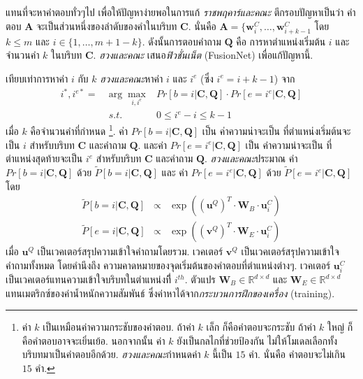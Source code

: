 แทนที่จะหาคำตอบทั่วๆไป เพื่อให้ปัญหาง่ายพอในการแก้ \textit{ราชพฤคาร์และคณะ}\cite{RajpurkarEtAl2016a} ตีกรอบปัญหาเป็นว่า
คำตอบ $\bm{A}$ จะเป็นส่วนหนึ่งของลำดับของคำในบริบท $\bm{C}$.
นั่นคือ $\bm{A} = \{\bm{w}_i^C, \ldots, \bm{w}_{i+k-1}^C$ โดย $k \leq m$ และ $i \in \{1, \ldots, m+1-k\}$.
ดังนั้นการตอบคำถาม $\bm{Q}$ คือ การหาตำแหน่งเริ่มต้น $i$ และจำนวนคำ $k$ ในบริบท $\bm{C}$.
\textit{ฮวงและคณะ}\cite{HuangEtAl2017a} เสนอ\textit{ฟิวชั่นเน็ต} (FusionNet) เพื่อแก้ปัญหานี้.

เทียบเท่าการหาค่า $i$ กับ $k$
\textit{ฮวงและคณะ}หาค่า $i$ และ $i^e$ (ซึ่ง $i^e = i + k -1$) จาก
\begin{eqnarray}
i^\ast, i^{e \ast} =& \arg\max_{i, i^e} & Pr[b=i|\bm{C}, \bm{Q}] \cdot Pr[e=i^e|\bm{C}, \bm{Q}] 
\label{eq: opt MRC objective function}
\nonumber \\
&\; s.t. & 0 \leq i^e - i \leq k - 1
\label{eq: opt MRC objective function condition}
\end{eqnarray}
เมื่อ $k$ คือจำนวนคำที่กำหนด%
\footnote{%
	ค่า $k$ เป็นเหมือนค่าความกระชับของคำตอบ.
	ถ้าค่า $k$ เล็ก ก็คือคำตอบจะกระชับ 
	ถ้าค่า $k$ ใหญ่ ก็คือคำตอบอาจจะเยิ่นเย้อ.
	นอกจากนั้น ค่า $k$ ยังเป็นกลไกที่ช่วยป้องกัน ไม่ให้โมเดลเลือกทั้งบริบทมาเป็นคำตอบอีกด้วย.
	\textit{ฮวงและคณะ}กำหนดค่า $k$ นี้เป็น $15$ คำ.
	นั่นคือ คำตอบจะไม่เกิน $15$ คำ.
}.
ค่า $Pr[b=i|\bm{C}, \bm{Q}]$ เป็น ค่าความน่าจะเป็น ที่ตำแหน่งเริ่มต้นจะเป็น $i$ สำหรับบริบท $\bm{C}$ และคำถาม $\bm{Q}$.
และค่า $Pr[e=i^e|\bm{C}, \bm{Q}]$ เป็น ค่าความน่าจะเป็น ที่ตำแหน่งสุดท้ายจะเป็น $i^e$ สำหรับบริบท $\bm{C}$ และคำถาม $\bm{Q}$.
\textit{ฮวงและคณะ}ประมาณ
ค่า $Pr[b=i|\bm{C}, \bm{Q}]$ 
ด้วย $\tilde{P}[b=i|\bm{C}, \bm{Q}]$
และ ค่า $Pr[e=i^e|\bm{C}, \bm{Q}]$ 
ด้วย $\tilde{P}[e=i^e|\bm{C}, \bm{Q}]$
โดย
%
\begin{eqnarray}
\tilde{P}[b=i|\bm{C}, \bm{Q}] & \propto & 
\exp{( (\bm{u}^Q)^T \cdot \bm{W}_B \cdot \bm{u}_i^C) }
\label{eq: opt fusion-net PS}
\nonumber
\\
\tilde{P}[e=i|\bm{C}, \bm{Q}] & \propto & 
\exp{( (\bm{v}^Q)^T \cdot \bm{W}_E \cdot \bm{u}_i^C) }
\label{eq: opt fusion-net PE}
\nonumber
\end{eqnarray}
เมื่อ $\bm{u}^Q$ เป็นเวคเตอร์สรุปความเข้าใจคำถามโดยรวม.
เวคเตอร์ $\bm{v}^Q$
เป็นเวคเตอร์สรุปความเข้าใจคำถามทั้งหมด 
โดยคำนึงถึง
ความคาดหมายของจุดเริ่มต้นของคำตอบที่ตำแหน่งต่างๆ.
เวคเตอร์ $\bm{u}_i^C$ เป็นเวคเตอร์แทนความเข้าใจบริบทในตำแหน่งทีี่ $i^{th}$.
ตัวแปร $\bm{W}_B \in \mathbb{R}^{d \times d}$
และ $\bm{W}_E \in \mathbb{R}^{d \times d}$
แทนเมตริกซ์ของค่าน้ำหนักความสัมพันธ์ 
ซึ่งค่าหาได้จาก\textit{กระบวนการฝึกของเครื่อง} (training).

